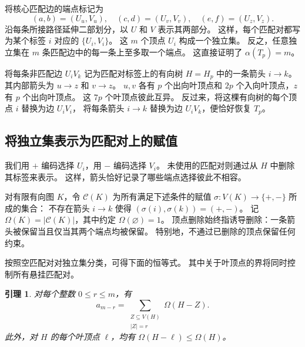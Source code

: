 \documentclass[UTF8,11pt,a4paper,fontset=fandol]{ctexart}
\newtheorem{lemma}[theorem]{引理}
\theoremstyle{remark}
\numberwithin{equation}{section}
\begin{document}
将核心匹配边的端点标记为
\[
 (a,b)=(U_u,V_u),\quad (c,d)=(U_v,V_v),\quad
 (e,f)=(U_z,V_z).
\]
沿每条所接路径延伸二部划分，以 $U$ 和 $V$ 表示其两部分。
这样，每个匹配对都写为某个标签 $i$ 对应的 $\{U_i,V_i\}$。
这 $m$ 个顶点 $U_i$ 构成一个独立集。
反之，任意独立集在 $m$ 条匹配边中的每一条上至多取一个端点。
这直接证明了 $\alpha(T_p)=m$。

将每条非匹配边 $U_iV_k$ 记为匹配对标签上的有向树 $H=H_p$ 中的一条箭头 $i\to k$。
其内部箭头为 $u\to z$ 和 $v\to z$。
$u,v$ 各有 $p$ 个出向叶顶点和 $2p$ 个入向叶顶点，$z$ 有 $p$ 个出向叶顶点。
这 $7p$ 个叶顶点彼此互异。
反过来，将这棵有向树的每个顶点 $i$ 替换为边 $U_iV_i$，
将每条箭头 $i\to k$ 替换为边 $U_iV_k$，便恰好恢复 $T_p$。

\subsection{将独立集表示为匹配对上的赋值}\label{sec:assignments}

我们用 $+$ 编码选择 $U_i$，用 $-$ 编码选择 $V_i$。
未使用的匹配对则通过从 $H$ 中删除其标签来表示。
这样，箭头恰好记录了哪些端点选择彼此不相容。

对有限有向图 $K$，令 $\mathcal C(K)$ 为所有满足下述条件的赋值
$\sigma:V(K)\to\{+,-\}$ 所成的集合：
不存在箭头 $i\to k$ 使得 $(\sigma(i),\sigma(k))=(+,-)$。
记 $\Omega(K)=|\mathcal C(K)|$，其中约定 $\Omega(\varnothing)=1$。
顶点删除始终指诱导删除：一条箭头被保留当且仅当其两个端点均被保留。
特别地，不通过已删除的顶点保留任何约束。

按照空匹配对对独立集分类，可得下面的恒等式。
其中关于叶顶点的界将同时控制所有悬挂匹配对。

\begin{lemma}
\label{lem:deletion}
对每个整数 $0\leq r\leq m$，有
\begin{equation}
 a_{m-r}=\sum_{\substack{Z\subseteq V(H)\\|Z|=r}}\Omega(H-Z).
 \label{eq:deletion}
\end{equation}
此外，对 $H$ 的每个叶顶点 $\ell$，均有 $\Omega(H-\ell)\leq\Omega(H)$。
\end{lemma}
\end{document}
